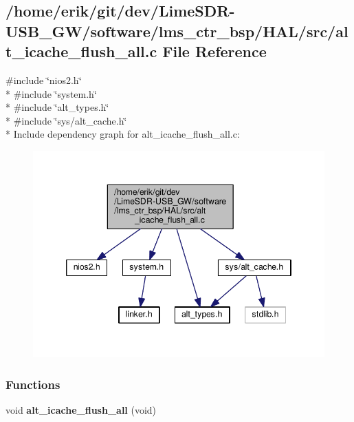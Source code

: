 \subsection{/home/erik/git/dev/\+Lime\+S\+D\+R-\/\+U\+S\+B\+\_\+\+G\+W/software/lms\+\_\+ctr\+\_\+bsp/\+H\+A\+L/src/alt\+\_\+icache\+\_\+flush\+\_\+all.c File Reference}
\label{alt__icache__flush__all_8c}
{\ttfamily \#include \char`\"{}nios2.\+h\char`\"{}}\\*
{\ttfamily \#include \char`\"{}system.\+h\char`\"{}}\\*
{\ttfamily \#include \char`\"{}alt\+\_\+types.\+h\char`\"{}}\\*
{\ttfamily \#include \char`\"{}sys/alt\+\_\+cache.\+h\char`\"{}}\\*
Include dependency graph for alt\+\_\+icache\+\_\+flush\+\_\+all.\+c\+:
\nopagebreak
\begin{figure}[H]
\begin{center}
\leavevmode
\includegraphics[width=346pt]{dc/d90/alt__icache__flush__all_8c__incl}
\end{center}
\end{figure}
\subsubsection*{Functions}
\begin{DoxyCompactItemize}
\item 
void {\bf alt\+\_\+icache\+\_\+flush\+\_\+all} (void)
\end{DoxyCompactItemize}


